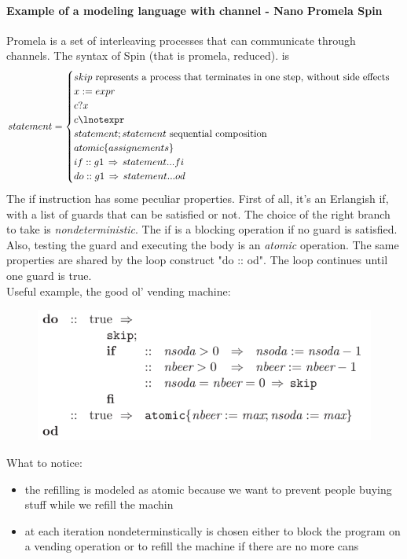 \documentclass{article}
\begin{document}
				\paragraph{Example of a modeling language with channel - Nano Promela Spin}
					Promela is a set of interleaving processes that can communicate through channels. The syntax of Spin (that is promela, reduced). is
					\begin{equation}
						statement = 
						\begin{cases}
							skip \text{ represents a process that terminates in one step, without side effects}\\
							x := expr \\
							c?x \\
							c\lnotexpr \\
							statement;statement \text{ sequential composition}\\
							atomic\{assignements\} \\
							if :: g1 \,\Rightarrow\, statement ... fi \\
							do :: g1 \,\Rightarrow\, statement ... od
						\end{cases}
					\end{equation}
					The if instruction has some peculiar properties. First of all, it's an Erlangish if, with a list of guards that can be satisfied or not. The choice of the right branch to take is \emph{nondeterministic}. The if is a blocking operation if no guard is satisfied. Also, testing the guard and executing the body is an \emph{atomic} operation. The same properties are shared by the loop construct "do :: od". The loop continues until one guard is true.\\
					Useful example, the good ol' vending machine:
					\begin{figure}[H]
						\centering
						\includegraphics[width = \textwidth]{./images/VendingSpin.png}
					\end{figure}
					What to notice: 
					\begin{itemize}
						\item the refilling is modeled as atomic because we want to prevent people buying stuff while we refill the machin
						\item at each iteration nondeterminstically is chosen either to block the program on a vending operation or to refill the machine if there are no more cans
					\end{itemize}
\end{document}
